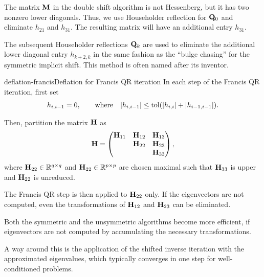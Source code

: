 \begin{remark}
  The matrix $\mathbf M$ in the double shift algorithm is not Hessenberg,
  but it has two nonzero lower diagonals. Thus, we use Householder
  reflection for $\mathbf Q_0$ and eliminate $h_{21}$ and $h_{31}$. The
  resulting matrix will have an additional entry $h_{31}$.

  The subsequent Householder reflections $\mathbf Q_k$ are used to
  eliminate the additional lower diagonal entry $h_{k+2,k}$ in the
  same fashion as the ``bulge chasing'' for the symmetric implicit
  shift. This method is often named  after its
  inventor.
\end{remark}

\begin{Algorithm*}{deflation-francis}{Deflation for Francis QR iteration}
  In each step of the Francis QR iteration, first set
  \begin{gather}
    h_{i,i-1} = 0, \qquad \text{where}\quad
    \lvert h_{i,i-1}\rvert \le \text{tol} (\lvert h_{i,i}\rvert+\lvert h_{i-1,i-1}\rvert).
  \end{gather}

  Then, partition the matrix
  $\mathbf H$ as
  \begin{gather}
    \mathbf H =
    \begin{pmatrix}
      \mathbf H_{11} & \mathbf H_{12} & \mathbf H_{13} \\
      & \mathbf H_{22} & \mathbf H_{23}\\
      && \mathbf H_{33}
    \end{pmatrix},
  \end{gather}
  where $\mathbf H_{22}\in\mathbb R^{q\times q}$ and
  $\mathbf H_{22}\in\mathbb R^{p\times p}$ are chosen maximal such that
  $\mathbf H_{33}$ is upper  and $\mathbf H_{22}$
  is unreduced.

  The Francis QR step is then applied to $\mathbf H_{22}$ only. If the
  eigenvectors are not computed, even the transformations of
  $\mathbf H_{12}$ and $\mathbf H_{23}$ can be eliminated.
\end{Algorithm*}

\begin{remark}
  Both the symmetric and the unsymmetric algorithms become more
  efficient, if eigenvectors are not computed by accumulating the
  necessary transformations.

  A way around this is the application of the shifted inverse
  iteration with the approximated eigenvalues, which typically
  converges in one step for well-conditioned problems.
\end{remark}


